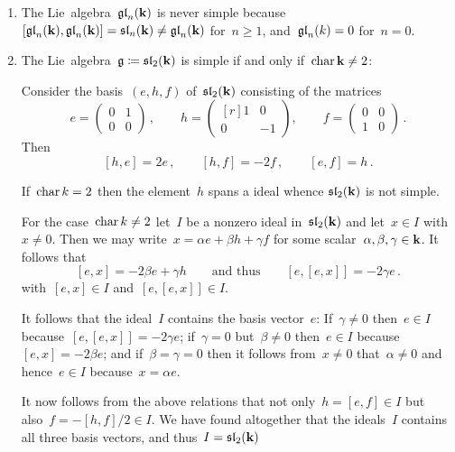 \begin{examples}
  \leavevmode
  \begin{enumerate}
    \item
      The Lie~algebra~$\mathfrak{gl}_n(\mathbf{k})$ is never simple because~$[\mathfrak{gl}_n(\mathbf{k}), \mathfrak{gl}_n(\mathbf{k})] = \mathfrak{sl}_n(\mathbf{k}) \neq \mathfrak{gl}_n(\mathbf{k})$ for~$n \geq 1$, and~$\mathfrak{gl}_n(k) = 0$ for~$n = 0$.
    \item
      The Lie~algebra~$\mathfrak{g} \coloneqq \mathfrak{sl}_2(\mathbf{k})$ is simple if and only if~$\operatorname{char} \mathbf{k} \neq 2$:
      
      Consider the basis~$(e,h,f)$ of~$\mathfrak{sl}_2(\mathbf{k})$ consisting of the matrices
      \[
        e
        =
        \begin{pmatrix}
          0 & 1 \\
          0 & 0
        \end{pmatrix} \,,
        \qquad
        h
        =
        \begin{pmatrix*}[r]
          1 &  0  \\
          0 & -1
        \end{pmatrix*},
        \qquad
        f
        =
        \begin{pmatrix}
          0 & 0 \\
          1 & 0
        \end{pmatrix} \,.
      \]
      Then
      \[
        [h,e] = 2e  \,,
        \qquad
        [h,f] = -2f \,,
        \qquad
        [e,f] = h \,.
      \]
      
      If~$\operatorname{char} k = 2$ then the element~$h$ spans a {\onedimensional} ideal whence $\mathfrak{sl}_2(\mathbf{k})$ is not simple.
      
      For the case~$\operatorname{char} k \neq 2$ let~$I$ be a nonzero ideal in~$\mathfrak{sl}_2(\mathbf{k})$ and let~$x \in I$ with~$x \neq 0$.
      Then we may write~$x = \alpha e + \beta h + \gamma f$ for some scalar~$\alpha, \beta, \gamma \in \mathbf{k}$.
      It follows that
      \[
        [e,x]
        =
        -2 \beta e + \gamma h
        \qquad \text{and thus}\qquad
        [e,[e,x]]
        =
        -2 \gamma e \,.
      \]
      with~$[e,x] \in I$ and~$[e,[e,x]] \in I$.
      
      It follows that the ideal~$I$ contains the basis vector~$e$:
      If~$\gamma \neq 0$ then~$e \in I$ because~$[e,[e,x]] = -2 \gamma e$;
      if~$\gamma = 0$ but~$\beta \neq 0$ then~$e \in I$ because~$[e,x] = -2 \beta e$;
      and if~$\beta = \gamma = 0$ then it follows from~$x \neq 0$ that~$\alpha \neq 0$ and hence~$e \in I$ because~$x = \alpha e$.
      
      It now follows from the above relations that not only~$h = [e,f] \in I$ but also~$f = -[h,f]/2 \in I$.
      We have found altogether that the ideals~$I$ contains all three basis vectors, and thus~$I = \mathfrak{sl}_2(\mathbf{k})$
  \end{enumerate}
\end{examples}


